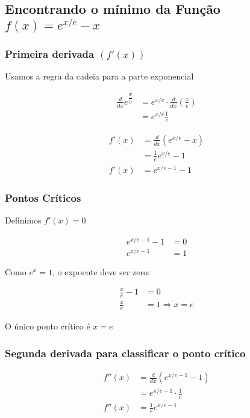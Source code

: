 \documentclass[../resumo.tex]{subfiles}
\begin{document}
	\subsection{Encontrando o mínimo da Função $f(x) = e^{x/e}-x$}

	\subsubsection{Primeira derivada $(f'(x))$}

	Usamos a regra da cadeia para a parte exponencial

	\begin{align*}
		\frac{d}{dx} e^{\dfrac{x}{e}} &= e^{x/e} \cdot \frac{d}{dx} \left( \frac{x}{e} \right) \\
																	&= e^{x/e} \frac{1}{e}
	\end{align*}

	\begin{align*}
		f'(x) &= \frac{d}{dx} ( e^{x/e} - x ) \\
					&= \frac{1}{e} e^{x/e} -1 \\
		f'(x) &= e^{x/e - 1} - 1
	\end{align*}

	\subsubsection{Pontos Críticos}

	Definimos $f'(x) = 0$

	\begin{align*}
		e^{x/e -1} - 1 &= 0 \\
				e^{x/e -1} &= 1
	\end{align*}

	Como $e^x = 1$, o expoente deve ser zero:

	\begin{align*}
		\frac{x}{e} - 1 &= 0 \\
		\frac{x}{e} &= 1 \Rightarrow x = e
	\end{align*}

	O único ponto crítico é $x = e$

	\subsubsection{Segunda derivada para classificar o ponto crítico}

	\begin{align*}
		f''(x) &= \frac{d}{dx} ( e^{x/e -1} - 1 ) \\
					 &= e^{x/e - 1} \cdot \frac{1}{e} \\
		f''(x) &= \frac{1}{e} e^{x/e - 1}
	\end{align*}
\end{document}
